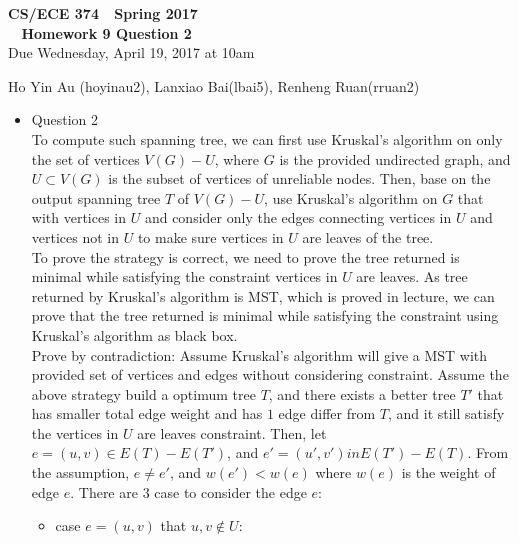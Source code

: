 \documentclass[11pt]{article}
\begin{document}
\begin{center}
\Large\textbf{CS/ECE 374 \,\decosix\,  Spring 2017}%
\\
\LARGE\textbf{\decothreeleft~ Homework 9 Question 2 ~\decothreeright}%
\\[0.5ex]
\large Due Wednesday, April 19, 2017 at 10am
\end{center}

\begin{center}


\begin{Large}
Ho Yin Au (hoyinau2), Lanxiao Bai(lbai5), Renheng Ruan(rruan2)
\end{Large}
\end{center}

\begin{itemize}
	\item	Question 2\\
		To compute such spanning tree, we can first use Kruskal's algorithm on only the set of vertices $V(G)-U$, where $G$ is the provided undirected graph, and $U\subset V(G)$ is the subset of vertices of unreliable nodes. Then, base on the output spanning tree $T$ of $V(G)-U$, use Kruskal's algorithm on $G$ that with vertices in $U$ and consider only the edges connecting vertices in $U$ and vertices not in $U$ to make sure vertices in $U$ are leaves of the tree.\\
		To prove the strategy is correct, we need to prove the tree returned is minimal while satisfying the constraint vertices in $U$ are leaves. As tree returned by Kruskal's algorithm is MST, which is proved in lecture, we can prove that the tree returned is minimal while satisfying the constraint using Kruskal's algorithm as black box.\\
		Prove by contradiction: Assume Kruskal's algorithm will give a MST with provided set of vertices and edges without considering constraint. Assume the above strategy build a optimum tree $T$, and there exists a better tree $T'$ that has smaller total edge weight and has $1$ edge differ from $T$, and it still satisfy the vertices in $U$ are leaves constraint. Then, let $e = (u,v) \in E(T)-E(T')$, and $e' = (u',v')in E(T')-E(T)$. From the assumption, $e \neq e'$, and $w(e') < w(e)$ where $w(e)$ is the weight of edge $e$. There are $3$ case to consider the edge $e$:\\
		\begin{itemize}
			\item	case $e = (u,v)$ that $u,v \notin U$:\\

\end{itemize}
\end{itemize}
\end{document}
